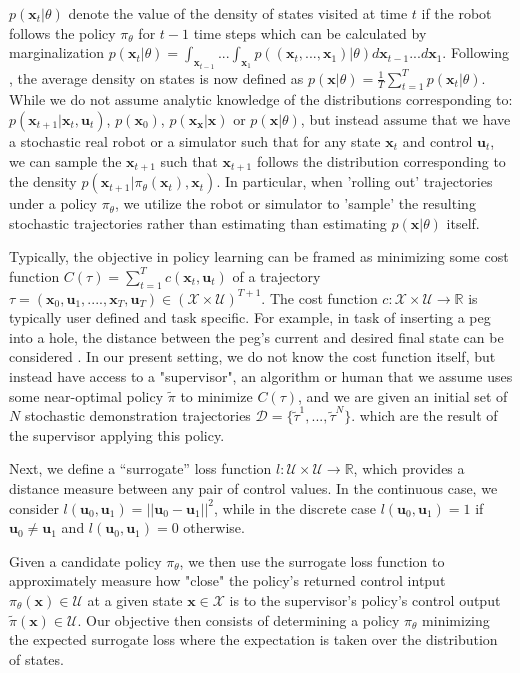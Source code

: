 \documentclass[10pt, conference]{ieeeconf}      %
\newcommand{\bu}{\mathbf{u}}
\newcommand{\bx}{\mathbf{x}}
\begin{document}
$p(\bx_t|\theta)$ denote the value of the density of states visited at time $t$ if the robot follows the policy
$\pi_{\theta}$ for $t-1$ time steps which can be calculated by marginalization $p(\bx_t|\theta) =
\int_{\bx_{t-1}}...\int_{\bx_1} p((\bx_t,...,\bx_1)|\theta) d\bx_{t-1}...d\bx_1$. Following \cite{ross2010reduction},
the average density on states is now defined as $p(\bx|\theta) = \frac{1}{T} \sum^T_{t=1} p(\bx_t|\theta)$.
While we do not assume analytic knowledge of the distributions corresponding to: $p(\bx_{t+1}|\bx_t,\bu_t)$, $p(\bx_0)$, $p(\bx_{\bx}|
\bx)$ or $p(\bx|\theta)$, but instead assume that we have a stochastic real robot or a simulator such that for any state
$\bx_t$ and control $\bu_t$, we can sample the $\bx_{t+1}$ such that $\bx_{t+1}$ follows the distribution corresponding
to the density $p(\bx_{t+1}|\pi_{\theta}(\bx_t),\bx_t)$. In particular, when 'rolling out' trajectories under a policy
$\pi_{\theta}$, we utilize the robot or simulator to 'sample' the resulting stochastic trajectories rather than
estimating than estimating $p(\bx|\theta)$ itself.

Typically, the objective in policy learning can be framed as minimizing some cost function $C(\tau) = \sum^T_{t=1} c(\bx_t,\bu_t)$
of a trajectory $\tau = (\mathbf{x}_0,\mathbf{u}_1, ...., \mathbf{x}_T,\mathbf{u}_T)\in (\mathcal{X}\times
\mathcal{U})^{T+1}$. The cost function $c:\mathcal{X}\times \mathcal{U}\to \mathbb{R}$ is typically user defined and task specific. 
For example, in task of inserting a peg into a hole, the distance between the peg's current and desired final state can
be considered \cite{levine2015end}.  In our present setting, we do not know the cost function itself, but instead have access to a "supervisor", 
an algorithm or human that we assume uses some near-optimal policy $\tilde{\pi}$ to minimize $C(\tau)$, and we are given
an initial set of $N$ stochastic demonstration trajectories $\mathcal{D} = \lbrace \tilde{\tau}^1,...,\tilde{\tau}^N \rbrace$. 
which are the result of the supervisor applying this policy. 

Next, we define a ``surrogate'' loss function $l:\mathcal{U}\times \mathcal{U}\to \mathbb{R}$, which provides a distance
measure between any pair of control values. In the continuous case, we consider $l(\bu_0,\bu_1) = ||\bu_0-\bu_1||^2$,
while in the discrete case $l(\bu_0,\bu_1) = 1$ if $\bu_0 \neq \bu_1$ and $l(\bu_0, \bu_1)=0$ otherwise.

Given a candidate policy $\pi_{\theta}$, we then use the surrogate loss function to approximately measure how "close" the policy's
returned control intput $\pi_{\theta}(\bx)\in \mathcal{U}$ at a given state $\bx\in \mathcal{X}$ is to the supervisor's policy's control output
$\tilde{\pi}(\bx)\in \mathcal{U}$. Our objective then consists of determining a policy $\pi_{\theta}$ minimizing the expected surrogate loss where the expectation is taken over the distribution of states. 
\end{document}
